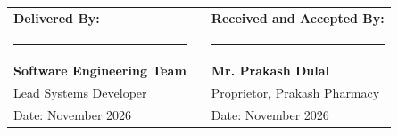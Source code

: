 \documentclass[11pt,a4paper]{article}
\begin{document}
\vspace{1.5cm}

\begin{center}
\begin{tabularx}{\textwidth}{p{6.5cm}Xp{6.5cm}}
\textbf{Delivered By:} & & \textbf{Received and Accepted By:} \\[1.4cm]
\rule{6.5cm}{0.4pt} & & \rule{6.5cm}{0.4pt} \\
\textbf{Software Engineering Team} & & \textbf{Mr. Prakash Dulal} \\
Lead Systems Developer & & Proprietor, Prakash Pharmacy \\
Date: November 2026 & & Date: November 2026 \\
\end{tabularx}
\end{center}
\end{document}
